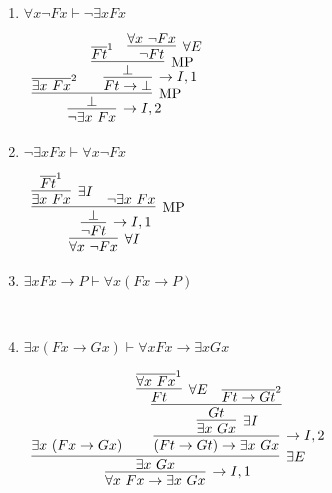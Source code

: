 \documentclass[11pt]{report}
\newcommand{\temp}[2]{{\overline{#2}}^{#1}}
\begin{document}
\begin{enumerate}
\begin{enumerate}
			\item $\forall x \neg Fx  \vdash  \neg \exists x Fx$
			
			\begin{center}
				$\begin{array}{c}
					\infer[\to I,2]{\lnot \exists x \ Fx}
						{\infer[\MP]{\bot}
							{\temp{2}{\exists x \ Fx}
							&
							\infer[\to I,1]{Ft \to \bot}
								{\infer[\MP]{\bot}
									{\temp{1}{Ft}
									&
									\infer[\forall E]{\lnot Ft}
										{\forall x \ \lnot Fx}}}}}
				\end{array}$
			\end{center}
			
			\item $\neg \exists x Fx \vdash \forall x \neg Fx $
			
			\begin{center}
				$\begin{array}{c}
					\infer[\forall I]{\forall x \ \lnot Fx}
						{\infer[\to I,1]{\lnot Ft}
							{\infer[\MP]{\bot}
								{\infer[\exists I]{\exists x \ Fx}
									{\temp{1}{Ft}}
								&
								\lnot \exists x \ Fx}}}
				\end{array}$
			\end{center}
			
			\item $ \exists x Fx \to P \vdash \forall x (Fx \to P)$
			
			\begin{center}
				$\begin{array}{c}
					\infer[]{}
						{}					
				\end{array}$
			\end{center}
			
			\item $\exists x (Fx \to Gx)  \vdash  \forall x Fx \to \exists x Gx$
			
			\begin{center}
				$\begin{array}{c}
					\infer[\to I,1]{\forall x \ Fx \to \exists x \ Gx}
						{\infer[\exists E]{\exists x \ Gx}
							{\exists x \ (Fx \to Gx)
							&
							\infer[\to I,2]{(Ft \to Gt) \to \exists x \ Gx}
								{\infer[\exists I]{\exists x \ Gx}
									{\infer[]{Gt}
										{\infer[\forall E]{Ft}
											{\temp{1}{\forall x \ Fx}}
										&
										\temp{2}{Ft \to Gt}}}}}}
				\end{array}$
			\end{center}
			

\end{enumerate}
\end{enumerate}
\end{document}
